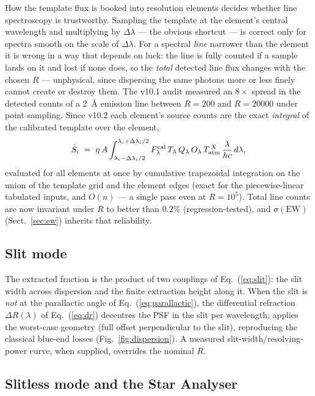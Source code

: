 How the template flux is booked into resolution elements decides whether
line spectroscopy is trustworthy. Sampling the template at the element's
central wavelength and multiplying by $\Delta\lambda$ — the obvious
shortcut — is correct only for spectra smooth on the scale of
$\Delta\lambda$. For a spectral \emph{line} narrower than the element it
is wrong in a way that depends on luck: the line is fully counted if a
sample lands on it and lost if none does, so the \emph{total} detected
line flux changes with the chosen $R$ — unphysical, since dispersing the
same photons more or less finely cannot create or destroy them. The
v10.1 audit measured an $8\times$ spread in the detected counts of a
\SI{2}{\angstrom} emission line between $R = 200$ and $R = 20000$ under
point sampling. Since v10.2 each element's source counts are the exact
\emph{integral} of the calibrated template over the element,
\begin{equation}
  \dot S_i \;=\; \eta\,A \int_{\lambda_i - \Delta\lambda_i/2}
  ^{\lambda_i + \Delta\lambda_i/2}
  F_\lambda^{\rm cal}\, T_\lambda\, Q_\lambda\, O_\lambda\,
  T_{\rm atm}^{\,X}\, \frac{\lambda}{hc}\, d\lambda ,
\end{equation}
evaluated for all elements at once by cumulative trapezoidal integration
on the union of the template grid and the element edges (exact for the
piecewise-linear tabulated inputs, and $O(n)$ — a single pass even at
$R = 10^5$). Total line counts are now invariant under $R$ to better
than 0.2\% (regression-tested), and $\sigma(\mathrm{EW})$
(Sect.~\ref{sec:ew}) inherits that reliability.

\subsection{Slit mode}
\label{sec:slit}

The extracted fraction is the product of two couplings of
Eq.~(\ref{eq:slit}): the slit width across dispersion and the finite
extraction height along it. When the slit is \emph{not} at the parallactic
angle of Eq.~(\ref{eq:parallactic}), the differential refraction
$\Delta R(\lambda)$ of Eq.~(\ref{eq:dr}) decentres the PSF in the slit per
wavelength; \spetc{} applies the worst-case geometry (full offset
perpendicular to the slit), reproducing the classical
\citet{filippenko1982} blue-end losses (Fig.~\ref{fig:dispersion}). A
measured slit-width/resolving-power curve, when supplied, overrides the
nominal $R$.

\subsection{Slitless mode and the Star Analyser}
\label{sec:slitless}

